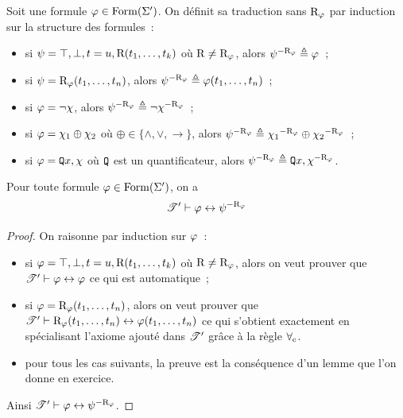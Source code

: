 \begin{definition}
  Soit une formule $\varphi \in \operatorname{Form}(\Sigma')$. On définit sa traduction sans
  $\mathrm{R}_{\varphi}$ par induction sur la structure des formules~:
  \begin{itemize}
  \item si $\psi = \top, \bot, t = u, \mathrm{R}(t_1,\ldots,t_k)$ où
    $\mathrm{R} \neq \mathrm{R}_{\varphi}$, alors ${\psi}^{-\mathrm{R}_{\varphi}} \triangleq \varphi$~;
  \item si $\psi = \mathrm{R}_{\varphi}(t_1,\ldots,t_n)$, alors
    ${\psi}^{-\mathrm{R}_{\varphi}} \triangleq \varphi(t_1,\ldots,t_n)$~;
  \item si $\varphi = \lnot \chi$, alors ${\psi}^{-\mathrm{R}_{\varphi}}\triangleq\lnot{\chi}^{-\mathrm{R}_{\varphi}}$~;
  \item si $\varphi = \chi_1 \oplus \chi_2$ où
    $\oplus \in \{\land,\lor,\to\}$,
    alors ${\psi}^{-\mathrm{R}_{\varphi}} \triangleq {\chi_1}^{-\mathrm{R}_{\varphi}} \oplus {\chi_2}^{-\mathrm{R}_{\varphi}}$~;
  \item si $\varphi = {\normalfont\texttt{Q}} x, \chi$ où ${\normalfont\texttt{Q}}$ est un quantificateur,
    alors ${\psi}^{-\mathrm{R}_{\varphi}} \triangleq {\normalfont\texttt{Q}} x, {\chi}^{-\mathrm{R}_{\varphi}}$.
  \end{itemize}
\end{definition}

\begin{proposition}
  Pour toute formule $\varphi \in \operatorname{Form}(\Sigma')$, on a
  \[\mathscr T' \vdash \varphi \mathrel{\leftrightarrow} {\psi}^{-\mathrm{R}_{\varphi}}\]
\end{proposition}

\begin{proof}
  On raisonne par induction sur $\varphi$~:
  \begin{itemize}
  \item si $\varphi = \top, \bot, t = u, \mathrm{R}(t_1,\ldots,t_k)$ où
    $\mathrm{R} \neq \mathrm{R}_{\varphi}$, alors on veut prouver que
    $\mathscr T' \vdash \varphi \mathrel{\leftrightarrow} \varphi$ ce qui est automatique~;
  \item si $\varphi = \mathrm{R}_{\varphi}(t_1,\ldots,t_n)$, alors on veut prouver que
    $\mathscr T' \vdash \mathrm{R}_{\varphi}(t_1,\ldots,t_n) \mathrel{\leftrightarrow} \varphi(t_1,\ldots,t_n)$
    ce qui s'obtient exactement en spécialisant l'axiome ajouté dans
    $\mathscr T'$ grâce à la règle $\mathord{\forall}_{\mathrm{e}}$.
  \item pour tous les cas suivants, la preuve est la conséquence d'un lemme que
    l'on donne en exercice.
  \end{itemize}

  Ainsi $\mathscr T' \vdash \varphi \mathrel{\leftrightarrow} {\psi}^{-\mathrm{R}_{\varphi}}$.
\end{proof}

